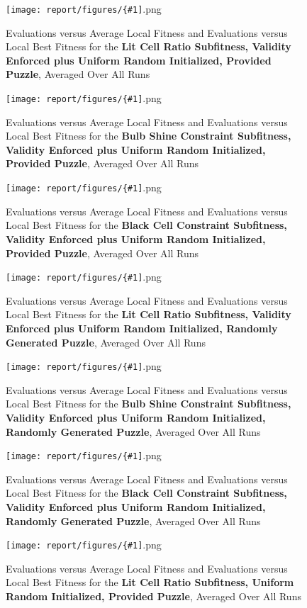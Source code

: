 \documentclass[11pt]{article}
\newcommand{\fitnessplotcaption}[1]{\caption{Evaluations versus Average Local Fitness and Evaluations versus 
    Local Best Fitness for the \textbf{{#1}}, Averaged Over All Runs}}
\newcommand{\addgraphic}[1]{\centerline{\texttt{[image: report/figures/\{\#1]}.png}}}
\begin{document}

\begin{figure}
    \addgraphic{website_puzzle_lit_cell_ratio__graph}
    \fitnessplotcaption{Lit Cell Ratio Subfitness, Validity Enforced plus Uniform Random Initialized, Provided Puzzle}
    \label{fig:website_v_ratio}
\end{figure}

\begin{figure}
    \addgraphic{website_puzzle_bulb_shine_constr__graph}
    \fitnessplotcaption{Bulb Shine Constraint Subfitness, Validity Enforced plus Uniform Random Initialized, Provided Puzzle}
    \label{fig:website_v_shine}
\end{figure}

\begin{figure}
    \addgraphic{website_puzzle_black_cell_constr__graph}
    \fitnessplotcaption{Black Cell Constraint Subfitness, Validity Enforced plus Uniform Random Initialized, Provided Puzzle}
    \label{fig:website_v_black}
\end{figure}

\begin{figure}
    \addgraphic{random_gen_lit_cell_ratio__graph}
    \fitnessplotcaption{Lit Cell Ratio Subfitness, Validity Enforced plus Uniform Random Initialized, Randomly Generated Puzzle}
    \label{fig:random_gen_v_ratio}
\end{figure}

\begin{figure}
    \addgraphic{random_gen_bulb_shine_constr__graph}
    \fitnessplotcaption{Bulb Shine Constraint Subfitness, Validity Enforced plus Uniform Random Initialized, Randomly Generated Puzzle}
    \label{fig:random_gen_v_shine}
\end{figure}

\begin{figure}
    \addgraphic{random_gen_black_cell_constr__graph}
    \fitnessplotcaption{Black Cell Constraint Subfitness, Validity Enforced plus Uniform Random Initialized, Randomly Generated Puzzle}
    \label{fig:random_gen_v_black}
\end{figure}



\begin{figure}
    \addgraphic{website_puzzle_uniform_random_init_lit_cell_ratio__graph}
    \fitnessplotcaption{Lit Cell Ratio Subfitness, Uniform Random Initialized, Provided Puzzle}
    \label{fig:website_u_ratio}
\end{figure}
\end{document}
